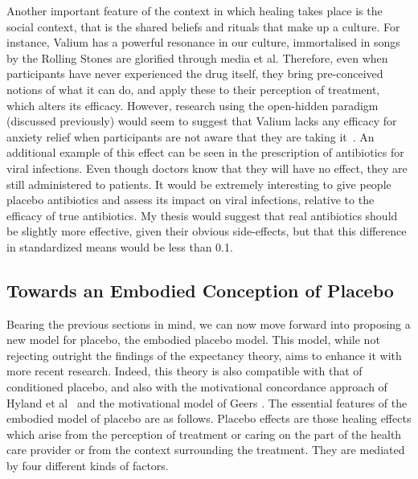 Another important feature of the context in which healing takes place is the social context, that is the shared beliefs and rituals that make up a culture. For instance, Valium has a powerful resonance in our culture, immortalised in songs by the Rolling Stones are glorified through media et al. Therefore, even when participants have never experienced the drug itself, they bring pre-conceived notions of what it can do, and apply these to their perception of treatment, which alters its efficacy. However, research using the open-hidden paradigm (discussed previously) would seem to suggest that Valium lacks any efficacy for anxiety relief when participants are not aware that they are taking it~\cite{benedetti2003}. An additional example of this effect can be seen in the prescription of antibiotics for viral infections. Even though doctors know that they will have no effect, they are still administered to patients. It would be extremely interesting to give people placebo antibiotics and assess its impact on viral infections, relative to the efficacy of true antibiotics. My thesis would suggest that real antibiotics should be slightly more effective, given their obvious side-effects, but that this difference in standardized means would be less than 0.1. 


\subsection{Towards an Embodied Conception of Placebo}
\label{sec:towards-an-embodied}
Bearing the previous sections in mind, we can now move forward into proposing a new model for placebo, the embodied placebo model. This model, while not rejecting outright the findings of the expectancy theory, aims to enhance it with more recent research. Indeed, this theory is also compatible with that of conditioned placebo, and also with the motivational concordance approach of Hyland et al~\cite{Hyland2007} and the motivational model of Geers \cite{Geers2005}.
The essential features of the embodied model of placebo are as follows. Placebo effects are those healing effects which arise from the perception of treatment or caring on the part of the health care provider or from the context surrounding the treatment. They are mediated by four different kinds of factors.


